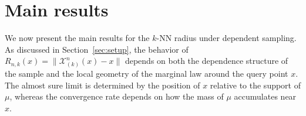 \documentclass[12pt]{article}
\def\P{{\mathrm P}}
\def\E{{\mathrm E}}
\def\R{{\mathbbm R}}
\newcommand{\zahl}[1]{\llbracket #1\rrbracket}
\theoremstyle{definition}
\begin{document}


\section{Main results}\label{sec:main}

We now present the main results for the $k$-NN radius under dependent sampling. As discussed in Section~\ref{sec:setup}, the behavior of $R_{n,k}(x)=\| \mathcal X_{(k)}^n(x)-x\|$ depends on both the dependence structure of the sample and the local geometry of the marginal law around the query point $x$. The almost sure limit is determined by the position of $x$ relative to the support of $\mu$, whereas the convergence rate depends on how the mass of $\mu$ accumulates near $x$. 
\end{document}

